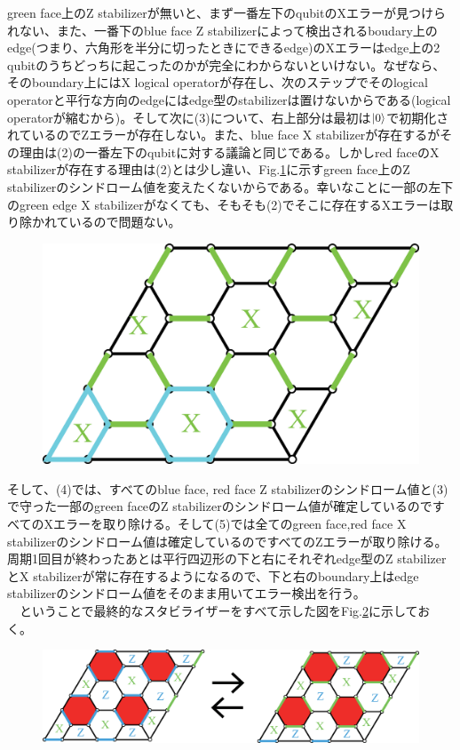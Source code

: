 \documentclass[a4paper,10pt]{ltjsarticle}
\begin{document}
{    green face上のZ stabilizerが無いと、まず一番左下のqubitのXエラーが見つけられない、また、一番下のblue face Z stabilizerによって検出されるboudary上のedge(つまり、六角形を半分に切ったときにできるedge)のXエラーはedge上の2 qubitのうちどっちに起こったのかが完全にわからないといけない。なぜなら、そのboundary上にはX logical operatorが存在し、次のステップでそのlogical operatorと平行な方向のedgeにはedge型のstabilizerは置けないからである(logical operatorが縮むから)。そして次に(3)について、右上部分は最初は$\ket{0}$で初期化されているのでZエラーが存在しない。また、blue face X stabilizerが存在するがその理由は(2)の一番左下のqubitに対する議論と同じである。しかしred faceのX stabilizerが存在する理由は(2)とは少し違い、Fig.\ref{figure9}に示すgreen face上のZ stabilizerのシンドローム値を変えたくないからである。幸いなことに一部の左下のgreen edge X stabilizerがなくても、そもそも(2)でそこに存在するXエラーは取り除かれているので問題ない。
    
    \begin{figure}[h]
        \centering
        \includegraphics[scale=0.2]{figure/figure9.eps}
        \caption{ }
        \label{figure9}
    \end{figure}

    そして、(4)では、すべてのblue face, red face Z stabilizerのシンドローム値と(3)で守った一部のgreen faceのZ stabilizerのシンドローム値が確定しているのですべてのXエラーを取り除ける。そして(5)では全てのgreen face,red face X stabilizerのシンドローム値は確定しているのですべてのZエラーが取り除ける。周期1回目が終わったあとは平行四辺形の下と右にそれぞれedge型のZ stabilizerとX stabilizerが常に存在するようになるので、下と右のboundary上はedge stabilizerのシンドローム値をそのまま用いてエラー検出を行う。\\
    　ということで最終的なスタビライザーをすべて示した図をFig.\ref{figure10}に示しておく。

    \begin{figure}[h]
        \centering
        \includegraphics[scale=0.25]{figure/figure10.eps}
        \caption{ }
        \label{figure10}
    \end{figure}
}
\clearpage
\end{document}
